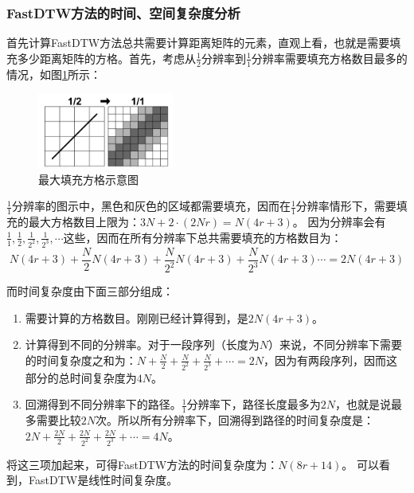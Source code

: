 \subsubsection{FastDTW方法的时间、空间复杂度分析}
首先计算FastDTW方法总共需要计算距离矩阵的元素，直观上看，也就是需要填充多少距离矩阵的方格。首先，考虑从$\frac{1}{2}$分辨率到$\frac{1}{1}$分辨率需要填充方格数目最多的情况，如图\ref{fig:11}所示：
\begin{figure}[h]
  \centering
  \includegraphics[width=0.4\textwidth]{./figure/evaluation.PNG}
  \caption{最大填充方格示意图}\label{fig:11}
\end{figure}

$\frac{1}{1}$分辨率的图示中，黑色和灰色的区域都需要填充，因而在$\frac{1}{1}$分辨率情形下，需要填充的最大方格数目上限为：$3N + 2\cdot (2Nr) = N(4r+3)$。 因为分辨率会有$\frac{1}{1},\frac{1}{2},\frac{1}{2^2},\frac{1}{2^3},\cdots$这些，因而在所有分辨率下总共需要填充的方格数目为：
\begin{equation}\label{equ:9}
  N\left( {4r + 3} \right) + \frac{N}{2}N\left( {4r + 3} \right) + \frac{N}{{{2^2}}}N\left( {4r + 3} \right) + \frac{N}{{{2^3}}}N\left( {4r + 3} \right) \cdots  = 2N\left( {4r + 3} \right)
\end{equation}

而时间复杂度由下面三部分组成：
\begin{enumerate}
  \item 需要计算的方格数目。刚刚已经计算得到，是$2N\left( {4r+3}\right)$。
  \item 计算得到不同的分辨率。对于一段序列（长度为$N$）来说，不同分辨率下需要的时间复杂度之和为：$N + \frac{N}{2} + \frac{N}{2^2} + \frac{N}{2^3} + \cdots = 2N$，因为有两段序列，因而这部分的总时间复杂度为$4N$。
  \item 回溯得到不同分辨率下的路径。$\frac{1}{1}$分辨率下，路径长度最多为$2N$，也就是说最多需要比较$2N$次。所以所有分辨率下，回溯得到路径的时间复杂度是：$2N + \frac{2N}{2} + \frac{2N}{2^2} + \frac{2N}{2^3} + \cdots = 4N$。
\end{enumerate}
将这三项加起来，可得FastDTW方法的时间复杂度为：$N(8r+14)$。
可以看到，FastDTW是线性时间复杂度。

